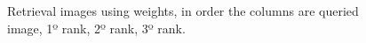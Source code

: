 \documentclass[12pt,a4paper]{article}
\begin{document}
\begin{figure}[!h]
{{		}
	}
	\enskip
	{
		{
			\setlength{\fboxsep}{1pt}
			\setlength{\fboxrule}{1pt}
		}
	}
	
	
	\caption{Retrieval images using weights, in order the columns are queried image, 1º rank, 2º rank, 3º rank.}
	\label{fig:complexAvr}
\end{figure}
\end{document}
